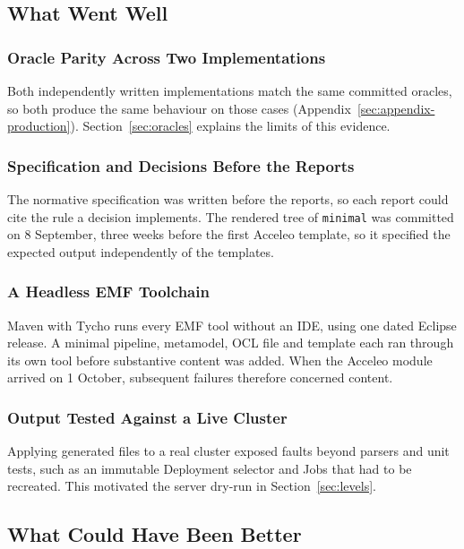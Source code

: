 \subsection{What Went Well}
\label{sec:went-well}

\subsubsection{Oracle Parity Across Two Implementations}
\label{sec:went-parity}

Both independently written implementations match the same committed
oracles, so both produce the same behaviour on those cases
(Appendix~\ref{sec:appendix-production}). Section~\ref{sec:oracles} explains the limits of this
evidence.

\subsubsection{Specification and Decisions Before the Reports}
\label{sec:went-spec}

The normative specification was written before the reports, so each report could
cite the rule a decision implements. The rendered tree of
\texttt{minimal} was committed on 8 September, three weeks before the first
Acceleo template, so it specified the expected output independently of the templates.

\subsubsection{A Headless EMF Toolchain}
\label{sec:went-headless}

Maven with Tycho runs every EMF tool without an IDE, using one dated Eclipse release.
A minimal pipeline, metamodel, OCL file and template each ran through its own tool
before substantive content was added. When the Acceleo module arrived on
1 October, subsequent failures therefore concerned content.

\subsubsection{Output Tested Against a Live Cluster}
\label{sec:went-cluster}

Applying generated files to a real cluster exposed faults beyond parsers and unit
tests, such as an immutable Deployment selector and Jobs that had to be recreated.
This motivated the server dry-run in Section~\ref{sec:levels}.

\subsection{What Could Have Been Better}
\label{sec:could-better}

